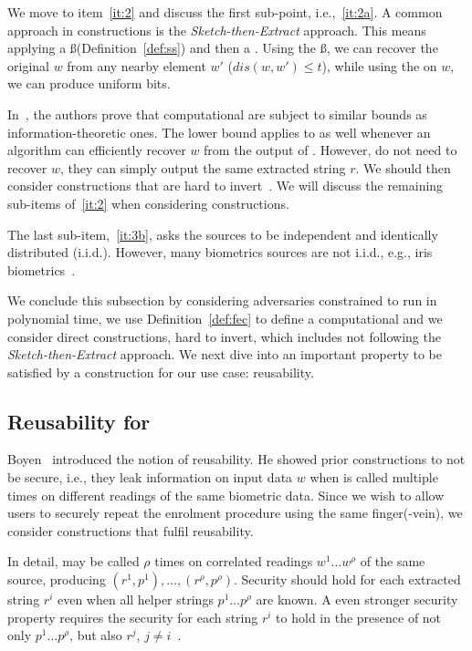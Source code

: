 We move to item~\ref{it:2} and discuss the first sub-point, i.e.,~\ref{it:2a}. 
A common approach in \fe constructions is the \textit{Sketch-then-Extract} approach. This means applying a \ss (Definition~\ref{def:ss}) and then a \re.
Using the \ss, we can recover the original $w$ from any nearby element $w'$ ($dis(w,w') \leq t$), while using the \re on $w$, we can produce uniform bits.

In~\cite{compfe}, the authors prove that computational \sss are subject to similar bounds as information-theoretic ones.
The lower bound applies to \fes as well whenever an algorithm can efficiently recover $w$ from the output of \rep. However, \fes do not need to recover $w$, they can simply output the same extracted string $r$.
We should then consider constructions that are hard to invert~\cite{compfe,yy}.
We will discuss the remaining sub-items of~\ref{it:2} when considering \rfe constructions.


The last sub-item,~\ref{it:3b}, asks the sources to be independent and identically distributed (i.i.d.).
However, many biometrics sources are not i.i.d., e.g., iris biometrics~\cite{iris}. %

We conclude this subsection by considering adversaries constrained to run in polynomial time, we use Definition~\ref{def:fec} to define a computational \fe and we consider direct constructions, hard to invert, which includes not following the \textit{Sketch-then-Extract} approach.
We next dive into an important property to be satisfied by a \fe construction for our use case: reusability.

\subsection{Reusability for \fes}\label{subsec:reuse}

Boyen~\cite{boyen} introduced the notion of reusability. He showed prior \fe constructions to not be secure, i.e., they leak information on input data $w$ when \gen is called multiple times on different readings of the same biometric data. Since we wish to allow users to securely repeat the enrolment procedure using the same finger(-vein), we consider constructions that fulfil reusability. 

In detail, \gen may be called $\rho$ times on correlated readings $w^1 \dots w^\rho$ of the same source, producing $(r^1,p^1),\dots, (r^\rho,p^\rho)$. Security should hold for each extracted string $r^i$ even when all helper strings $p^1 \dots p^\rho$ are known. A even stronger security property requires the security for each string $r^i$ to hold in the presence of not only $p^1 \dots p^\rho$, but also $r^j$, $j\neq i$~\cite{reusablefe}.

